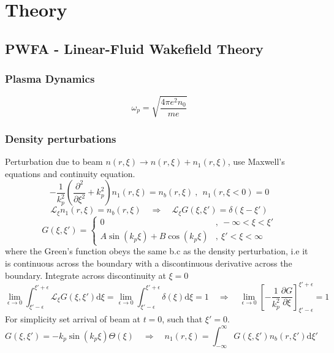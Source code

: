 \chapter{Theory}


\section{PWFA - Linear-Fluid Wakefield Theory}
\subsection{Plasma Dynamics}
\begin{equation}
\omega_p=\sqrt{\frac{4\pi e^2n_0}{me}}
\end{equation}
\subsection{Density perturbations}
Perturbation due to beam $n\left(r,\xi \right)\to n\left(r,\xi \right)+n_1\left(r,\xi \right)$, use Maxwell's equations and continuity equation.
\begin{equation}
-\frac{1}{k_p^2}\left(\frac{\partial^2 }{\partial \xi^2}+k_p^2\right)n_1\left(r,\xi \right)=n_b\left(r,\xi \right) ~,~~n_1\left(r,\xi<0 \right)=0
\end{equation}
\begin{equation}
\mathcal{L}_{\xi}n_1\left(r,\xi \right)=n_b\left(r,\xi \right) \quad \Rightarrow \quad \mathcal{L}_{\xi}G\left(\xi,\xi'\right)=\delta\left(\xi-\xi'\right)
\end{equation}
\begin{equation}
G\left(\xi,\xi'\right)=\left\{ \begin{array}{ll}
0 &,~ -\infty<\xi<\xi'\\
A\sin\left(k_p\xi \right) + B\cos\left(k_p\xi \right) &,~ \xi'<\xi<\infty
\end{array}\right.
\end{equation}
where the Green's function obeys the same b.c as the density perturbation, i.e it is continuous across the boundary with a discontinuous derivative across the boundary.
Integrate across discontinuity at $\xi=0$
\begin{equation}
\lim_{\epsilon\to 0}\int_{\xi'-\epsilon}^{\xi'+\epsilon} \mathcal{L}_{\xi}G\left(\xi,\xi'\right)\mathrm{d}\xi=\lim_{\epsilon\to 0}\int_{\xi'-\epsilon}^{\xi'+\epsilon}\delta\left(\xi\right)\mathrm{d}\xi=1 \quad \Rightarrow \quad \lim_{\epsilon\to 0}\left[-\frac{1}{k_p^2}\frac{\partial G}{\partial \xi}\right]^{\xi'+\epsilon}_{\xi'-\epsilon}=1
\end{equation}
For simplicity set arrival of beam at $t=0$, such that $\xi'=0$.
\begin{equation}
G\left(\xi,\xi'\right)=-k_p\sin\left(k_p\xi \right)\Theta\left(\xi \right) \quad \Rightarrow \quad n_1\left(r,\xi \right)=\int_{-\infty}^{\infty}G\left(\xi,\xi'\right)n_b\left(r,\xi' \right) \mathrm{d}\xi'
\end{equation}
